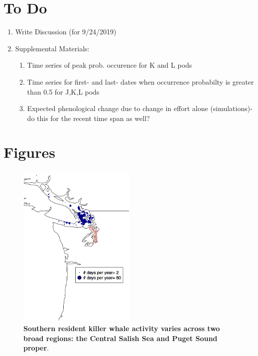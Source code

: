 \documentclass{article}
\begin{document}
\section*{To Do}
\begin{enumerate}
\item Write Discussion (for 9/24/2019)
\item Supplemental Materials:
\begin{enumerate}
\item Time series of peak prob. occurence for K and L pods
\item Time series for first- and last- dates when occurrence probabilty is greater than 0.5 for J,K,L pods
\item Expected phenological change due to change in effort alone (simulations)- do this for the recent time span as well?

\end{enumerate}
\end{enumerate}



\section* {Figures}

\begin{figure}[p]
\includegraphics[width=0.5\textwidth]{../analyses/figures/OrcaPhenPlots/srkw_justmap_assumeSRKW_April1.png} 
\caption{\textbf{Southern resident killer whale activity varies across two broad regions: the Central Salish Sea and Puget Sound proper}. }
 \label{fig:map}
 \end{figure}
 
\end{document}
